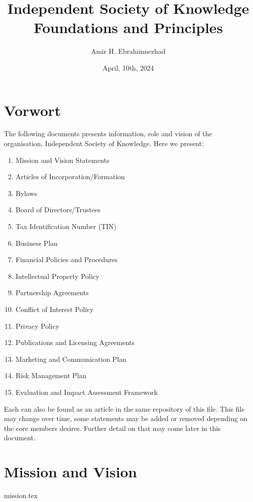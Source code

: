 \documentclass[10pt]{article}
\begin{document}
    \title{Independent Society of Knowledge \\ \large Foundations and Principles}
    \author{Amir H. Ebrahimnezhad}
    \date{April, 10th, 2024}
    \maketitle
    \tableofcontents


    \newpage
    \section{Vorwort}\label{sec:vorwort}

    The following documents presents information, role and vision of the organisation, Independent Society of Knowledge.
    Here we present:
    \begin{enumerate}
        \item Mission and Vision Statements
        \item Articles of Incorporation/Formation
        \item Bylaws
        \item Board of Directors/Trustees
        \item Tax Identification Number (TIN)
        \item Business Plan
        \item Financial Policies and Procedures
        \item Intellectual Property Policy
        \item Partnership Agreements
        \item Conflict of Interest Policy
        \item Privacy Policy
        \item Publications and Licensing Agreements
        \item Marketing and Communication Plan
        \item Risk Management Plan
        \item Evaluation and Impact Assessment Framework
    \end{enumerate}
    Each can also be found as an article in the same repository of this file.
    This file may change over time, some statements may be added or removed depending on the core members desires.
    Further detail on that may come later in this document.

    \section{Mission and Vision}\label{sec:mission-and-vision}
    {mission.tex}
\end{document}
